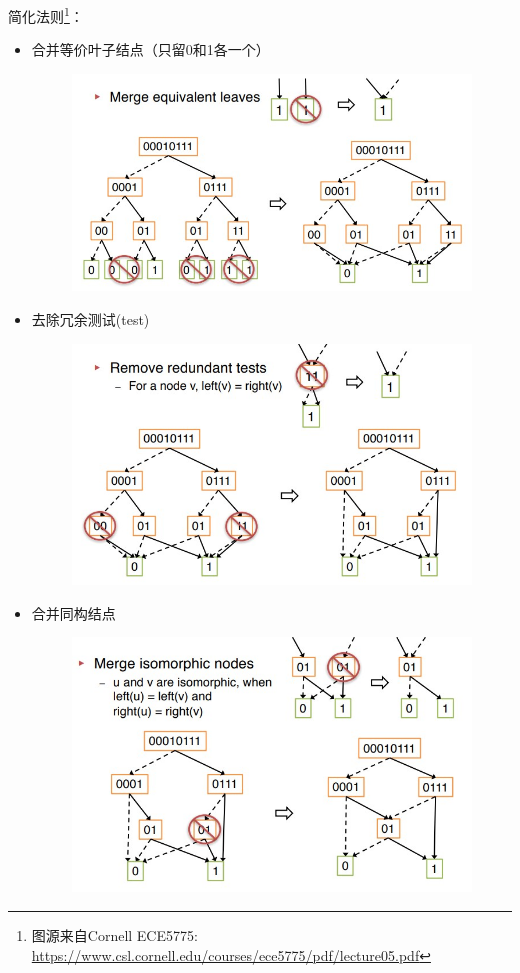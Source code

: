 简化法则\footnote{图源来自Cornell ECE5775: \url{https://www.csl.cornell.edu/courses/ece5775/pdf/lecture05.pdf}}：
\begin{itemize}
	\item 合并等价叶子结点（只留0和1各一个）
	\begin{figure}[H]
	\centering
	\includegraphics[width=0.8\linewidth]{fig/bdd_reduction1.jpg}
	\end{figure}
	\item 去除冗余测试(test)
	\begin{figure}[H]
	\centering
	\includegraphics[width=0.8\linewidth]{fig/bdd_reduction2.jpg}
	\end{figure}
	\item 合并同构结点
	\begin{figure}[H]
	\centering
	\includegraphics[width=0.8\linewidth]{fig/bdd_reduction3.jpg}
	\end{figure}
\end{itemize}
